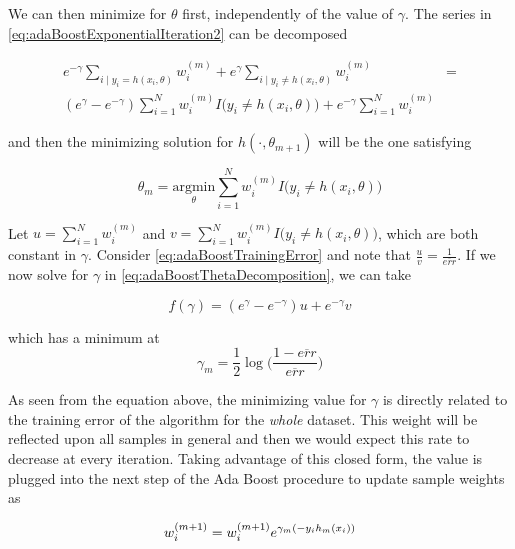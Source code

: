 We can then minimize for $\theta$ first, independently of the value of $\gamma$.
The series in \cref{eq:adaBoostExponentialIteration2} can be decomposed

\begin{equation}\label{eq:adaBoostThetaDecomposition}
\begin{split}
e^{-\gamma} \sum_{i \mid y_i = h(x_i,\theta)} w_i^{(m)} + e^{\gamma} \sum_{i \mid y_i \neq h(x_i,\theta)} w_i^{(m)} & = \\
( e^{\gamma} - e^{-\gamma}) \sum_{i = 1}^{N} w_i^{(m)} I \big( y_i \neq h(x_i,\theta)  \big) + e^{-\gamma} \sum_{i = 1}^{N}  w_i^{(m)} &
\end{split}
\end{equation}


and then the minimizing solution for $h(\cdot, \theta_{m+1})$ will be the one satisfying

\begin{equation}\label{eq:adaBoostThetaMinimization}
\theta_{m} = \underset{ \theta}{\mathrm{argmin}} \sum_{i=1}^{N} w_i^{(m)} I \big( y_i \neq h(x_i,\theta)  \big)
\end{equation}

Let $u = \sum_{i=1}^{N} w_i^{(m)}$ and $v = \sum_{i=1}^{N} w_i^{(m)} I \big( y_i \neq h(x_i,\theta)  \big) $, which are both constant in $\gamma$.
Consider \cref{eq:adaBoostTrainingError} and note that $\frac{u}{v} = \frac{1}{\overline{err}}$.
If we now solve for $\gamma$ in \cref{eq:adaBoostThetaDecomposition}, we can take

\begin{equation}\label{eq:adaBoostBetaMinimization}
f(\gamma) = ( e^{\gamma} - e^{-\gamma}) u + e^{-\gamma}v
\end{equation}

which has a minimum at
\begin{equation}
\gamma_{m} = \frac{1}{2} \log\big( \frac{1 - \overline{err} }{ \overline{err} } \big)
\end{equation}

As seen from the equation above, the minimizing value for $\gamma$ is directly related to the training error of the algorithm for the \textit{whole} dataset.
This weight will be reflected upon all samples in general and then we would expect this rate to decrease at every iteration.
Taking advantage of this closed form, the value is plugged into the next step of the Ada Boost procedure to update sample weights as

\begin{equation}
w_i^{(m+1)} =  w_i^{(m+1)} e^{\gamma_m(-y_i h_m(x_i))} \\
\end{equation}

